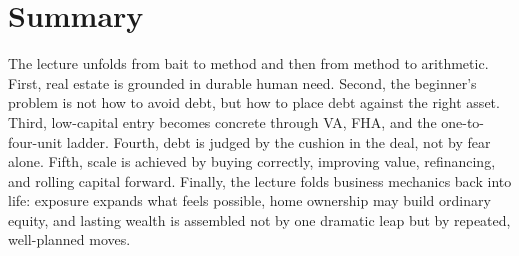 \section{Summary}

The lecture unfolds from bait to method and then from method to arithmetic. First, real estate is grounded in durable human need. Second, the beginner's problem is not how to avoid debt, but how to place debt against the right asset. Third, low-capital entry becomes concrete through VA, FHA, and the one-to-four-unit ladder. Fourth, debt is judged by the cushion in the deal, not by fear alone. Fifth, scale is achieved by buying correctly, improving value, refinancing, and rolling capital forward. Finally, the lecture folds business mechanics back into life: exposure expands what feels possible, home ownership may build ordinary equity, and lasting wealth is assembled not by one dramatic leap but by repeated, well-planned moves.